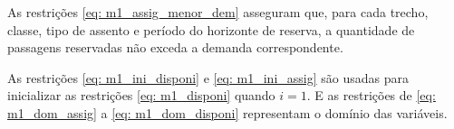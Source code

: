 As restrições \eqref{eq: m1_assig_menor_dem} asseguram que, para cada trecho, classe, tipo de assento e período do horizonte de reserva, a quantidade de passagens reservadas não exceda a demanda correspondente.
\allowdisplaybreaks

As restrições \eqref{eq: m1_ini_disponi} e \eqref{eq: m1_ini_assig} são usadas para inicializar as restrições \eqref{eq: m1_disponi} quando \(i = 1\). E as restrições de \eqref{eq: m1_dom_assig} a \eqref{eq: m1_dom_disponi} representam o domínio das variáveis.





